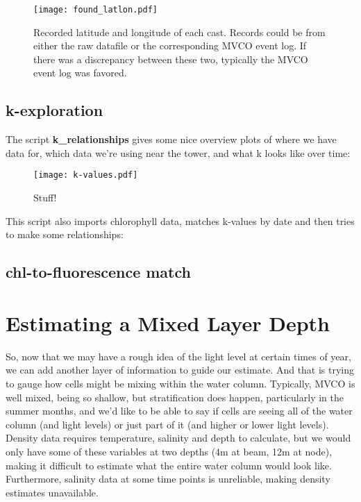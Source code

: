 \documentclass[11pt]{article}
\begin{document}
 \begin{figure}[h]
\centering
\texttt{[image: found\_latlon.pdf]}
\caption{Recorded latitude and longitude of each cast. Records could be from either the raw datafile or the corresponding MVCO event log. If there was a discrepancy between these two, typically the MVCO event log was favored.}
\end{figure}

\clearpage

\subsection{k-exploration}

The script \textbf{k\_relationships} gives some nice overview plots of where we have data for, which data we're using near the tower, and what k looks like over time:

 
 \begin{figure}[h]
\centering
\texttt{[image: k-values.pdf]}
\caption{Stuff!}
\end{figure}

This script also imports chlorophyll data, matches k-values by date and then tries to make some relationships:

\subsection{chl-to-fluorescence match}


\section{Estimating a Mixed Layer Depth}

So, now that we may have a rough idea of the light level at certain times of year, we can add another layer of information to guide our estimate. And that is trying to gauge how cells might be mixing within the water column. Typically, MVCO is well mixed, being so shallow, but stratification does happen, particularly in the summer months, and we'd like to be able to say if cells are seeing all of the water column (and light levels) or just part of it (and higher or lower light levels). Density data requires temperature, salinity and depth to calculate, but we would only have some of these variables at two depths (4m at beam, 12m at node), making it difficult to estimate what the entire water column would look like. Furthermore, salinity data at some time points is unreliable, making density estimates unavailable.
\end{document}
